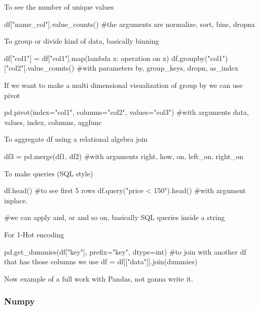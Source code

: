 To see the number of unique values

\begin{pythoncode}
    df["name_col"].value_counts() #the arguments are normalize, sort, bins, dropna
\end{pythoncode}

To group or divide kind of data, basically binning

\begin{pythoncode}
    df["col1"] = df["col1"].map(lambda x: operation on x)
    df.groupby("col1") ["col2"].value_counts() #with parameters by, group_keys, dropn, as_index
\end{pythoncode}

If we want to make a multi dimensional visualization of group by we can use pivot

\begin{pythoncode}
    

pd.pivot(index="col1", columns="col2", values="col3") #with arguments data, values, index, columns, aggfunc

\end{pythoncode}

To aggregate df using a relational algebra join

\begin{pythoncode}
    df3 = pd.merge(df1, df2) #with arguments right, how, on, left_on, right_on
\end{pythoncode}

To make queries (SQL style)

\begin{pythoncode}
    df.head() #to see first 5 rows
    df.query("price < 150").head() #with argument inplace. 

    #we can apply and, or and so on, basically SQL queries inside a string
\end{pythoncode}

For 1-Hot encoding

\begin{pythoncode}
    pd.get_dummies(df["key"], prefix="key", dtype=int) #to join with another df that has those columns we use
    df = df[["data"]].join(dummies)
\end{pythoncode}

Now example of a full work with Pandas, not gonna write it.


\subsubsection{Numpy}



